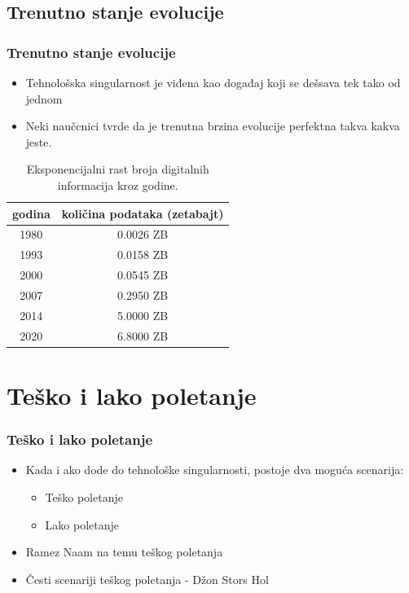 \documentclass{beamer}
\begin{document}
\subsection{Trenutno stanje evolucije}
\begin{frame}[fragile]\frametitle{Trenutno stanje evolucije}
	\begin{itemize}	
		\item Tehnološska singularnost je viđena kao događaj koji se dešsava tek tako od
jednom
            \item Neki naučcnici tvrde da je trenutna brzina evolucije perfektna takva kakva
jeste.
	\end{itemize}
 
        \begin{table}[h!]
            \begin{center}
                \begin{tabular}{|c|c|} \hline
                    \textbf{godina}& \textbf{količina podataka (zetabajt)}\\ \hline
                        1980 &0.0026 ZB\\ \hline
                        1993 &0.0158 ZB\\ \hline
                        2000 &0.0545 ZB\\ \hline
                        2007 &0.2950 ZB\\ \hline
                        2014 &5.0000 ZB\\ \hline
                        2020 &6.8000 ZB\\ \hline
                \end{tabular}
            \caption{Eksponencijalni rast broja digitalnih informacija kroz godine.}
            \label{tab:tabela1}
            \end{center}
        \end{table}
\end{frame}

\section{Teško i lako poletanje}

\begin{frame}[fragile]\frametitle{Teško i lako poletanje}
	\begin{itemize}	
		\item Kada i ako dode do tehnološke singularnosti, postoje dva moguća scenarija:
  \begin{itemize}
  \item Teško poletanje 
  \item  Lako poletanje
  \end{itemize}
		\item Ramez Naam na temu teškog poletanja
		\item Česti scenariji teškog poletanja - Džon Stors Hol
	\end{itemize}
\end{frame}
\end{document}
